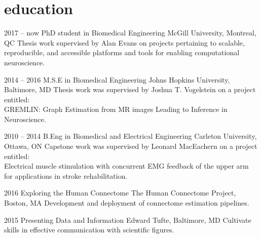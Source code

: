\documentclass[]{friggeri-cv} %
\begin{document}

\section{education}

\begin{entrylist}


\entry
{2017 -- now}
{PhD student {\normalfont in Biomedical Engineering}}
{McGill University, Montreal, QC}
{Thesis work supervised by Alan Evans on projects pertaining to scalable, reproducible, and
accessible platforms and tools for enabling computational neuroscience.}


\entry
{2014 -- 2016}
{M.S.E {\normalfont in Biomedical Engineering}}
{Johns Hopkins University, Baltimore, MD}
{Thesis work was supervised by Joshua T. Vogelstein on a project entitled:\\GREMLIN:
Graph Estimation from MR images Leading to Inference in Neuroscience.}


\entry
{2010 -- 2014}
{B.Eng {\normalfont in Biomedical and Electrical Engineering}}
{Carleton University, Ottawa, ON}
{Capstone work was supervised by Leonard MacEachern on a project entitled:\\Electrical
muscle stimulation with concurrent EMG feedback of the upper arm for applications in stroke
rehabilitation.}


\entry
{2016}
{Exploring the Human Connectome}
{The Human Connectome Project, Boston, MA}
{Development and deployment of connectome estimation pipelines.}


\entry
{2015}
{Presenting Data and Information}
{Edward Tufte, Baltimore, MD}
{Cultivate skills in effective communication with scientific figures.}

\end{entrylist}

\end{document}
